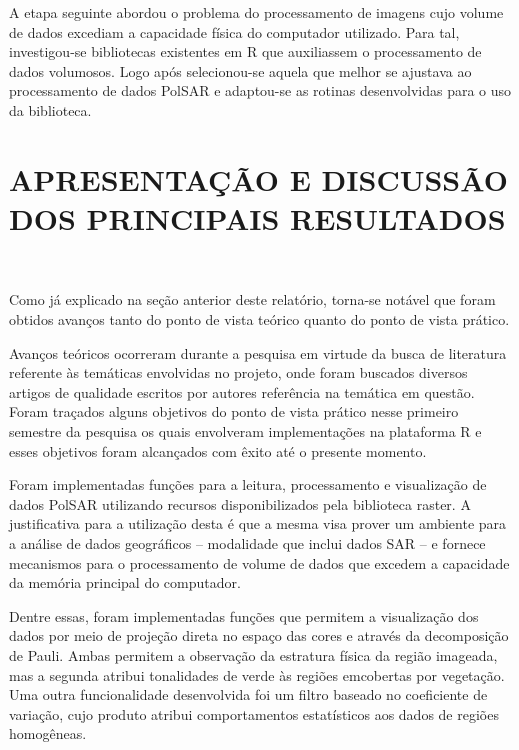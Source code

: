 \documentclass[12pt]{article}
\begin{document}
A etapa seguinte abordou o problema do processamento de imagens cujo volume de dados excediam a capacidade física do computador utilizado. Para tal, investigou-se bibliotecas existentes em R que auxiliassem o processamento de dados volumosos. Logo após selecionou-se aquela que melhor se ajustava ao processamento de dados PolSAR e adaptou-se as rotinas desenvolvidas para o uso da biblioteca.

\newpage
\section*{\centering \textbf{APRESENTAÇÃO E DISCUSSÃO DOS PRINCIPAIS RESULTADOS}}
\hrulefill \\

\vspace{0.5cm}

Como já explicado na seção anterior deste relatório, torna-se notável que foram obtidos avanços tanto do ponto de vista teórico quanto do ponto de vista prático.

Avanços teóricos ocorreram durante a pesquisa em virtude da busca de literatura referente às temáticas envolvidas no projeto, onde foram buscados diversos artigos de qualidade escritos por autores referência na temática em questão. Foram traçados alguns objetivos do ponto de vista prático nesse primeiro semestre da pesquisa os quais envolveram implementações na plataforma R e esses objetivos foram alcançados com êxito até o presente momento.

Foram implementadas funções para a leitura, processamento e visualização de dados PolSAR utilizando recursos disponibilizados pela biblioteca raster. A justificativa para a utilização desta é que a mesma visa prover um ambiente para a análise de dados geográficos -- modalidade que inclui dados SAR -- e fornece mecanismos para o processamento de volume de dados que excedem a capacidade da memória principal do computador. 

Dentre essas, foram implementadas funções que permitem a visualização dos dados por meio de projeção direta no espaço das cores e através da decomposição de Pauli. Ambas permitem a observação da estratura física da região imageada, mas a segunda atribui tonalidades de verde às regiões emcobertas por vegetação. Uma outra funcionalidade desenvolvida foi um filtro baseado no coeficiente de variação, cujo produto atribui comportamentos estatísticos aos dados de regiões homogêneas.
\end{document}
